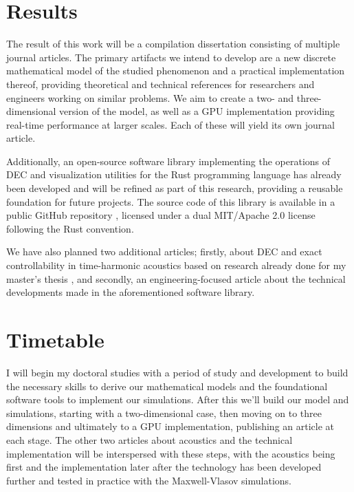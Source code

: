 \documentclass{article}
\begin{document}
\section*{Results}

The result of this work will be a compilation dissertation
consisting of multiple journal articles.
The primary artifacts we intend to develop
are a new discrete mathematical model of the studied phenomenon
and a practical implementation thereof,
providing theoretical and technical references
for researchers and engineers working on similar problems.
We aim to create a two- and three-dimensional version of the model,
as well as a GPU implementation providing real-time performance at larger scales.
Each of these will yield its own journal article.

Additionally, an open-source software library implementing the operations of DEC
and visualization utilities
for the Rust programming language
has already been developed and will be refined as part of this research,
providing a reusable foundation for future projects.
The source code of this library is available
in a public GitHub repository \parencite{myyra_m0lentumdexterior_2024},
licensed under a dual MIT/Apache 2.0 license following the Rust convention.

We have also planned two additional articles;
firstly, about DEC and exact controllability in time-harmonic acoustics
based on research already done for my master's thesis \parencite{myyra_discrete_2023},
and secondly, an engineering-focused article about the technical developments
made in the aforementioned software library.

\section*{Timetable}

I will begin my doctoral studies with a period of study and development
to build the necessary skills to derive our mathematical models
and the foundational software tools to implement our simulations.
After this we'll build our model and simulations,
starting with a two-dimensional case,
then moving on to three dimensions
and ultimately to a GPU implementation,
publishing an article at each stage.
The other two articles about acoustics and the technical implementation
will be interspersed with these steps,
with the acoustics being first
and the implementation later after the technology has been developed further
and tested in practice with the Maxwell-Vlasov simulations.
\end{document}
